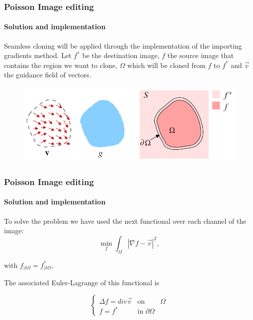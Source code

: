 \documentclass[11pt]{beamer}
\begin{document}
\begin{frame}
\frametitle{Poisson Image editing}
\framesubtitle{Solution and implementation}
Seamless cloning will be applied through the implementation of the importing gradients method. Let $f^{*}$ be the destination image, $f$ the source image that contains the region we want to clone, $\Omega$ which will be cloned from $f$ to $f^{*}$  and $\overrightarrow{v}$ the guidance field of vectors.\newline
\begin{figure}
\begin{center}
\includegraphics[scale=0.55]{Seamless_cloning}
\end{center}
\end{figure}
\end{frame}


\begin{frame}
\frametitle{Poisson Image editing}
\framesubtitle{Solution and implementation}
To solve the problem we have used the next functional over each channel of the image:
\begin{equation*}
\min_{f}\int_{\Omega }\left | \nabla f-\overrightarrow{v} \right |^{2},
\label{eq:functional}
\end{equation*}

with $f_{\mid \delta \Omega}=f_{\mid \delta \Omega}^{*}$, \newline

The associated Euler-Lagrange of this functional is

\begin{equation*}
\left\{\begin{matrix}
 \Delta f=div \overrightarrow{v} & \text{on } & \Omega\\ 
 f=f^{*}& \text{in }\partial\Omega
\end{matrix}\right.
\label{eq:Poisson_general}
\end{equation*}
\end{frame}
\end{document}
